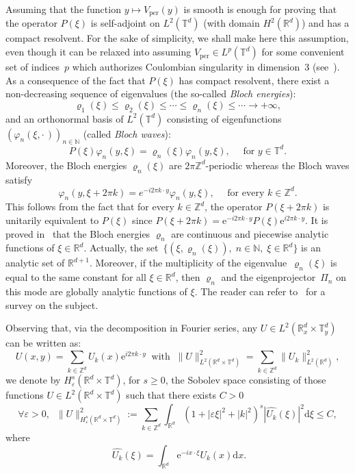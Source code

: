 \documentclass[10pt]{amsart}
\theoremstyle{definition}
\DeclareMathOperator{\per}{per}
\newcommand*\R{{\mathbb R}}
\newcommand*\N{{\mathbb N}}
\newcommand*\Z{{\mathbb Z}}
\newcommand*\T{{\mathbb T}}
\newcommand*\eps{\varepsilon}
\numberwithin{equation}{section}
\newcommand{\ee}{{\mathrm e}}
\let\oldforall\forall
\renewcommand*{\forall}{\mathrel{\oldforall}}
\newcommand*{\dd}{\mathrm{d}}
\newcommand*{\dx}{\dd x}
\newcommand*{\dxi}{\dd \xi}
\begin{document}
Assuming that the function $y\mapsto V_{\per}(y)$ is smooth is enough for proving that the operator $P(\xi)$ is self-adjoint on $L^2(\T^d)$ (with domain $H^2(\R^d)$) and has a compact resolvent. For the sake of simplicity, we shall make here this assumption, even though it can be relaxed into assuming $V_{\per}\in L^p (\T^d)$ for some convenient set of indices~$p$ which authorizes Coulombian singularity in dimension~$3$ (see~\cite{lewin_lecture}). As a consequence of the fact that $P(\xi)$ has compact resolvent, there exist a non-decreasing sequence of eigenvalues (the so-called \emph{Bloch energies}):
\[
\varrho_1(\xi)\leq \varrho_2(\xi)\leq \cdots\leq \varrho_n(\xi) \leq \cdots \longrightarrow +\infty,
\]
and an orthonormal basis of $L^2(\T^d)$ consisting of eigenfunctions $\left(\varphi_n(\xi,\cdot\,)\right)_{n\in\N}$ (called \emph{Bloch waves}):
\[
P(\xi)\varphi_n(y,\xi)=\varrho_n(\xi)\varphi_n(y,\xi),\quad \text{ for }y\in\T^d.
\]
Moreover, the Bloch energies $\varrho_n(\xi)$ are $2\pi\Z^d$-periodic whereas the Bloch waves satisfy
\[
\varphi_n(y,\xi+2\pi k)=e^{-i2\pi k\cdot y}\varphi_n(y,\xi),\quad \text{ for every } k\in\Z^d.
\]
This follows from the fact that for every $k\in\Z^d$, the operator $P(\xi+2\pi k)$ is unitarily equivalent to $P(\xi)$ since $P(\xi + 2\pi k) = {\ee}^{-i2\pi k\cdot y}P(\xi){\ee}^{i2\pi k\cdot y}$. It is proved in~\cite{Wilcox78} that the Bloch energies $\varrho_n$ are continuous and piecewise analytic functions of $\xi\in\R^d$. Actually, the set~$\{(\xi,\varrho_n(\xi)),\;n\in\N,\;\xi\in\R^d \}$ is an analytic set of $\R^{d+1}$. Moreover, if the multiplicity of the eigenvalue~$\varrho_n(\xi)$ is equal to the same constant for all $\xi\in\R^d$, then $\varrho_n$ and the eigenprojector~$\Pi_n$ on this mode are globally analytic functions of $\xi$. The reader can refer to~\cite{Kuch16} for a survey on the subject.


Observing that, via the decomposition in Fourier series, any $U\in L^2(\R^d_x\times\T^d_y)$ can be written as:
\[
U(x,y)=\sum_{k\in\Z^d}U_k(x){\ee}^{i2\pi k\cdot y}\;\;\text{with}\;\;
\|U\|_{L^2(\R^d\times\T^d)}^2=\sum_{k\in\Z^d}\|U_k\|_{L^2(\R^d)}^2,
\]
we denote by $H^s_\eps(\R^d\times\T^d)$, for $s\geq 0$, the Sobolev space consisting of those functions $U \in L^2(\R^d\times\T^d)$ such that there exists $C>0$
\begin{equation}\label{def:Hseps}
\forall \eps>0,\;\;\|U\|_{H^s_\eps(\R^d\times\T^d)}^2:=\sum_{k\in\Z^d}\int_{\R^d}(1+|\eps\xi|^2+|k|^2)^s|\widehat{U_k}(\xi)|^2\dxi\leq C,
\end{equation}
where 
\[
\;\widehat{U_k}(\xi)= \int_{\R^d} {\ee}^{-ix\cdot \xi} U_k(x) \dx.
\]
\end{document}

